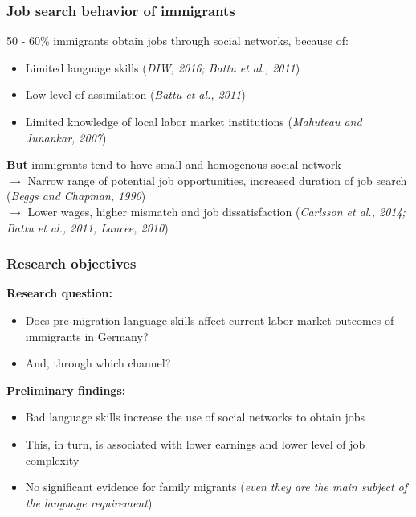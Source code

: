 \documentclass{beamer}
\begin{document}
\begin{frame}
\frametitle{Job search behavior of immigrants}
50 - 60\% immigrants obtain jobs through social networks, because of:

\begin{itemize}
\item Limited language skills (\textit{DIW, 2016; Battu et al., 2011})
\item Low level of assimilation (\textit{Battu et al., 2011})
\item Limited knowledge of local labor market institutions (\textit{Mahuteau and Junankar, 2007})
\end{itemize}

\textbf{But} immigrants tend to have small and homogenous social network \\
$\rightarrow$ Narrow range of potential job opportunities, increased duration of job search (\textit{Beggs and Chapman, 1990}) \\
$\rightarrow$ Lower wages, higher mismatch and job dissatisfaction (\textit{Carlsson et al., 2014; Battu et al., 2011; Lancee, 2010})

\end{frame}


\begin{frame}
\frametitle{Research objectives}
\textbf {Research question:}
\begin{itemize}
\item Does pre-migration language skills affect current labor market outcomes of immigrants in Germany? 
\item And, through which channel? 
\end{itemize}

\textbf {Preliminary findings:}
\begin{itemize}
\item Bad language skills increase the use of social networks to obtain jobs
\item This, in turn, is associated with lower earnings and lower level of job complexity
\item No significant evidence for family migrants (\textit{even they are the main subject of the language requirement}) \\
\end{itemize}
\end{frame}
\end{document}
